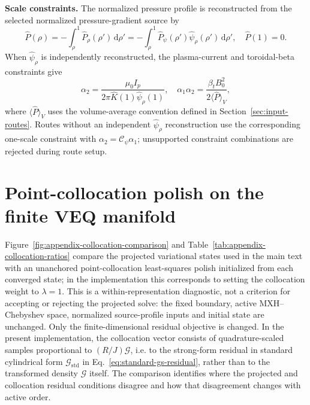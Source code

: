 \documentclass[final, 3p, times]{elsarticle}
\makeatletter
\newcommand{\appendixlabel}[1]{%
  \begingroup
  \protected@edef\@currentlabel{\@Alph\c@section}%
  \label{#1}%
  \endgroup
}
\newcommand{\routeclosure}[1]{\par\medskip\noindent\textbf{#1.}\quad}
\makeatother
\begin{document}
\routeclosure{Scale constraints}
The normalized pressure profile is reconstructed from the selected normalized pressure-gradient source by
\begin{equation}
    \hat{P}(\rho)=-\int_\rho^1 \hat{P}_\rho(\rho')\,\mathrm{d}\rho'
    =-\int_\rho^1 \hat{P}_\psi(\rho')\hat{\psi}_\rho(\rho')\,\mathrm{d}\rho',\quad \hat{P}(1)=0.
\end{equation}
When $\hat{\psi}_\rho$ is independently reconstructed, the plasma-current and toroidal-beta constraints give
\begin{equation*}
    \alpha_2
    =\frac{\mu_0 I_p}{2\pi\hat{K}(1)\hat{\psi}_\rho(1)},
    \quad
    \alpha_1\alpha_2
    =\frac{\beta_tB_0^2}{2\langle\hat{P}\rangle_V},
\end{equation*}
where $\langle\hat{P}\rangle_V$ uses the volume-average convention defined in Section~\ref{sec:input-routes}. Routes without an independent $\hat{\psi}_\rho$ reconstruction use the corresponding one-scale constraint with $\alpha_2=\mathcal{C}_\psi\alpha_1$; unsupported constraint combinations are rejected during route setup.

\section{Point-collocation polish on the finite VEQ manifold}
\appendixlabel{app:collocation-comparison}

Figure~\ref{fig:appendix-collocation-comparison} and Table~\ref{tab:appendix-collocation-ratios} compare the projected variational states used in the main text with an unanchored point-collocation least-squares polish initialized from each converged state; in the implementation this corresponds to setting the collocation weight to $\lambda=1$. This is a within-representation diagnostic, not a criterion for accepting or rejecting the projected solve: the fixed boundary, active MXH--Chebyshev space, normalized source-profile inputs and initial state are unchanged. Only the finite-dimensional residual objective is changed. In the present implementation, the collocation vector consists of quadrature-scaled samples proportional to $(R/J)\mathcal{G}$, i.e. to the strong-form residual in standard cylindrical form $\mathcal{G}_{\mathrm{std}}$ in Eq.~\eqref{eq:standard-gs-residual}, rather than to the transformed density $\mathcal{G}$ itself. The comparison identifies where the projected and collocation residual conditions disagree and how that disagreement changes with active order.
\end{document}
